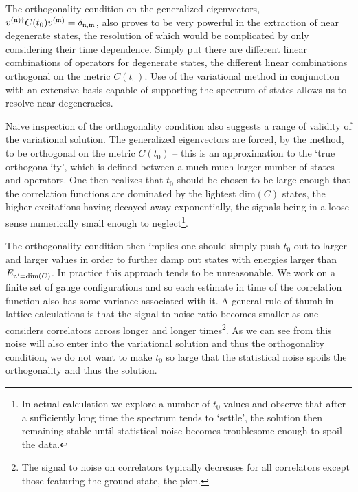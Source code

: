 The orthogonality condition on the generalized eigenvectors, $v^{(\mathfrak{n})\dagger} C(t_0) v^{(\mathfrak{m})} = \delta_{\mathfrak{n},\mathfrak{m}}$, also proves to be very powerful in the extraction of near degenerate states, the resolution of which would be complicated by only considering their time dependence. Simply put there are different linear combinations of operators for degenerate states, the different linear combinations orthogonal on the metric $C(t_0)$.  Use of the variational method in conjunction with an extensive basis capable of supporting the spectrum of states allows us to resolve near degeneracies.

Naive inspection of the orthogonality condition also suggests a range of validity of the variational solution. The generalized eigenvectors are forced, by the method, to be orthogonal on the metric $C(t_0)$ -- this is an approximation to the `true orthogonality', which is defined between a much much larger number of states and operators. One then realizes that $t_0$ should be chosen to be large enough that the correlation functions are dominated by the lightest $\mathrm{dim}(C)$ states, the higher excitations having decayed away exponentially, the signals being in a loose sense numerically small enough to neglect\footnote{In actual calculation we explore a number of $t_0$ values and observe that after a sufficiently long time the spectrum tends to `settle', the solution then remaining stable until statistical noise becomes troublesome enough to spoil the data.}. 

The orthogonality condition then implies one should simply push $t_0$ out to larger and larger values in order to further damp out states with energies larger than $E_{\mathfrak{n}'=\mathrm{dim}(C)}$. In practice this approach tends to be unreasonable. We work on a finite set of gauge configurations and so each estimate in time of the correlation function also has some variance associated with it. A general rule of thumb in lattice calculations is that the signal to noise ratio becomes smaller as one considers correlators across longer and longer times\footnote{The signal to noise on correlators typically decreases for all correlators except those featuring the ground state, the pion.}.  As we can see from  this noise will also enter into the variational solution and thus the orthogonality condition, we do not want to make $t_0$ so large that the statistical noise spoils the orthogonality and thus the solution. 

